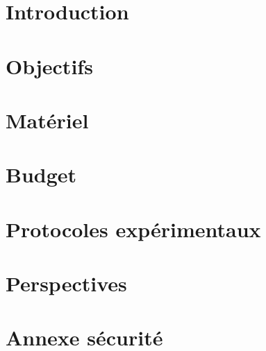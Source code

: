 \documentclass{article}
\begin{document}


\tableofcontents

\newpage

\section{{Introduction}}


\section{{Objectifs}}


\section{{Matériel}}


\section{{Budget}}


\section{{Protocoles expérimentaux}}


\section{{Perspectives}}


\section{{Annexe sécurité}}




\end{document}
